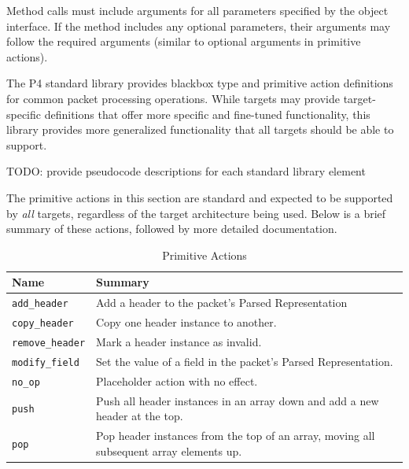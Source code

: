 \documentclass[12pt]{article}
\begin{document}
Method calls must include arguments for all parameters specified by the
object interface. If the method includes any optional parameters, their
arguments may follow the required arguments (similar to optional arguments in 
primitive actions).


The P4 standard library provides blackbox type and primitive action definitions
for common packet processing operations. While targets may provide target-
specific definitions that offer more specific and fine-tuned functionality, this
library provides more generalized functionality that all targets should be able
to support.

TODO: provide pseudocode descriptions for each standard library element


The primitive actions in this section are standard and expected to be supported
by \textit{all} targets, regardless of the target architecture being used.
Below is a brief summary of these actions, followed by more detailed
documentation.

\begin{table}[H]
\begin{center}
\begin{tabular}{| l | p{} |} \hline
\textbf{Name} &
\textbf{Summary} \\ \hline
\texttt{add_header} &
Add a header to the packet's Parsed Representation \\ \hline
\texttt{copy_header} &
Copy one header instance to another. \\ \hline
\texttt{remove_header} &
Mark a header instance as invalid. \\ \hline
\texttt{modify_field} &
Set the value of a field in the packet's Parsed Representation. \\ \hline
\texttt{no_op} &
Placeholder action with no effect. \\ \hline
\texttt{push} &
Push all header instances in an array down and add a new header at the top. \\ \hline
\texttt{pop} &
Pop header instances from the top of an array, moving all subsequent array elements up. \\ \hline
\end{tabular}
\end{center}
\caption{Primitive Actions}
\label{tab:primitiveactions}
\end{table}
\end{document}
